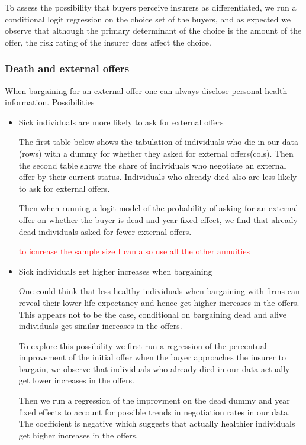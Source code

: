 \documentclass[12pt]{article}
\begin{document}


To assess the possibility that buyers perceive insurers as differentiated, we run a conditional logit regression on the choice set of the buyers, and as expected we observe that although the primary determinant of the choice is the amount of the offer, the risk rating of the insurer does affect the choice. 

\subsubsection{Death and external offers}
When bargaining for an external offer one can always disclose personal health information. Possibilities 
\begin{itemize}
    \item Sick individuals are more likely to ask for external offers
    
    The first table below shows the tabulation of individuals who die in our data (rows) with  a dummy for whether they asked for external offers(cols). Then the second table shows the share of individuals who negotiate an external offer by their current status. Individuals who already died also are less likely to ask for external offers. 

    
    Then when running a logit model of the probability of asking for an external offer on whether the buyer is dead and year fixed effect, we find that already dead individuals asked for fewer external offers. 

    \textcolor{red}{ to icnrease the sample size I can also use all the other annuities}






\newpage
    \item Sick individuals get higher increases when bargaining 
    
    One could think that less healthy individuals when bargaining with firms can reveal their lower life expectancy and hence get higher increases in the offers. This appears not to be the case, conditional on bargaining dead and alive individuals get similar increases in the offers. 

    To explore this possibility we first run a regression of the percentual improvement of the initial offer when the buyer approaches the insurer to bargain, we observe that individuals who already died in our data actually get lower increases in the offers. 

    Then we run a regression of the improvment on the dead dummy and year fixed effects to account for possible trends in negotiation rates in our data. The coefficient is negative which suggests that actually healthier individuals get higher increases in the offers.

    

    


\end{itemize}
\end{document}

